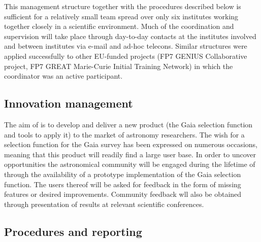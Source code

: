 This management structure together with the procedures described below is sufficient for a relatively small team spread over only six institutes working together closely in a scientific environment. Much of the coordination and supervision will take place through day-to-day contacts at the institutes involved and between institutes via e-mail and ad-hoc telecons. Similar structures were applied successfully to other EU-funded projects (FP7 GENIUS Collaborative project, FP7 GREAT Marie-Curie Initial Training Network) in which the coordinator was an active participant.

\subsection{Innovation management}
\label{sec:innovationmgmt}

The aim of {\acro} is to develop and deliver a new product (the Gaia selection function and tools to apply it) to the market of astronomy researchers. The wish for a selection function for the Gaia survey has been expressed on numerous occasions, meaning that this product will readily find a large user base. In order to uncover opportunities the astronomical community will be engaged during the lifetime of {\acro} through the availability of a prototype implementation of the Gaia selection function. The users thereof will be asked for feedback in the form of missing features or desired improvements. Community feedback wll also be obtained through presentation of {\acro} results at relevant scientific conferences.

\subsection{Procedures and reporting}
\label{sec:procedures}

